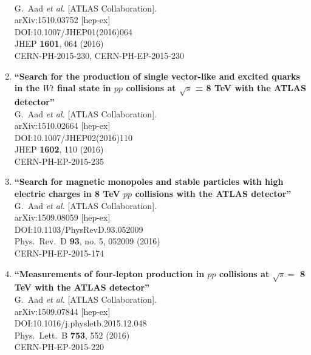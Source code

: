 \documentclass{article}
\begin{document}
\begin{enumerate}
  \\{}G.~Aad {\it et al.} [ATLAS Collaboration].
  \\{}arXiv:1510.03752 [hep-ex]
  \\{}DOI:10.1007/JHEP01(2016)064
  \\{}JHEP {\bf 1601}, 064 (2016)
  \\{}CERN-PH-2015-230, CERN-PH-EP-2015-230
\item%
{\bf ``Search for the production of single vector-like and excited quarks in the $Wt$ final state in $pp$ collisions at $\sqrt{s}$ = 8 TeV with the ATLAS detector''}
  \\{}G.~Aad {\it et al.} [ATLAS Collaboration].
  \\{}arXiv:1510.02664 [hep-ex]
  \\{}DOI:10.1007/JHEP02(2016)110
  \\{}JHEP {\bf 1602}, 110 (2016)
  \\{}CERN-PH-EP-2015-235
\item%
{\bf ``Search for magnetic monopoles and stable particles with high electric charges in 8 TeV $pp$ collisions with the ATLAS detector''}
  \\{}G.~Aad {\it et al.} [ATLAS Collaboration].
  \\{}arXiv:1509.08059 [hep-ex]
  \\{}DOI:10.1103/PhysRevD.93.052009
  \\{}Phys.\ Rev.\ D {\bf 93}, no. 5, 052009 (2016)
  \\{}CERN-PH-EP-2015-174
\item%
{\bf ``Measurements of four-lepton production in $pp$ collisions at $\sqrt{s}=$ 8 TeV with the ATLAS detector''}
  \\{}G.~Aad {\it et al.} [ATLAS Collaboration].
  \\{}arXiv:1509.07844 [hep-ex]
  \\{}DOI:10.1016/j.physletb.2015.12.048
  \\{}Phys.\ Lett.\ B {\bf 753}, 552 (2016)
  \\{}CERN-PH-EP-2015-220

\end{enumerate}
\end{document}

